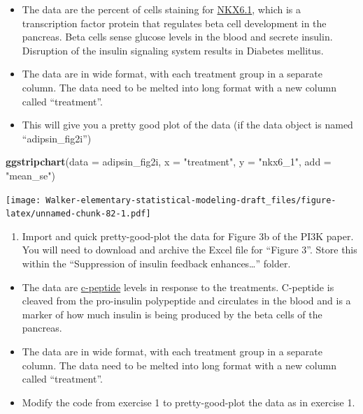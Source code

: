 \documentclass[]{book}
\newenvironment{Shaded}{\begin{snugshade}}{\end{snugshade}}
\newcommand{\DataTypeTok}[1]{\textcolor[rgb]{0.13,0.29,0.53}{#1}}
\newcommand{\KeywordTok}[1]{\textcolor[rgb]{0.13,0.29,0.53}{\textbf{#1}}}
\newcommand{\NormalTok}[1]{#1}
\newcommand{\StringTok}[1]{\textcolor[rgb]{0.31,0.60,0.02}{#1}}
\providecommand{\tightlist}{%
  \setlength{\itemsep}{0pt}\setlength{\parskip}{0pt}}
\begin{document}
\begin{itemize}
\tightlist
\item
  The data are the percent of cells staining for \href{https://en.wikipedia.org/wiki/NKX6-1}{NKX6.1}, which is a transcription factor protein that regulates beta cell development in the pancreas. Beta cells sense glucose levels in the blood and secrete insulin. Disruption of the insulin signaling system results in Diabetes mellitus.
\item
  The data are in wide format, with each treatment group in a separate column. The data need to be melted into long format with a new column called ``treatment''.
\item
  This will give you a pretty good plot of the data (if the data object is named ``adipsin\_fig2i'')
\end{itemize}

\begin{Shaded}
\begin{Highlighting}[]
\KeywordTok{ggstripchart}\NormalTok{(}\DataTypeTok{data =}\NormalTok{ adipsin_fig2i,}
             \DataTypeTok{x =} \StringTok{"treatment"}\NormalTok{,}
             \DataTypeTok{y =} \StringTok{"nkx6_1"}\NormalTok{,}
             \DataTypeTok{add =} \StringTok{"mean_se"}\NormalTok{)}
\end{Highlighting}
\end{Shaded}

\texttt{[image: Walker-elementary-statistical-modeling-draft\_files/figure-latex/unnamed-chunk-82-1.pdf]}

\begin{enumerate}
\def\labelenumi{\arabic{enumi}.}
\setcounter{enumi}{1}
\tightlist
\item
  Import and quick pretty-good-plot the data for Figure 3b of the PI3K paper. You will need to download and archive the Excel file for ``Figure 3''. Store this within the ``Suppression of insulin feedback enhances\ldots{}'' folder.
\end{enumerate}

\begin{itemize}
\tightlist
\item
  The data are \href{https://en.wikipedia.org/wiki/C-peptide}{c-peptide} levels in response to the treatments. C-peptide is cleaved from the pro-insulin polypeptide and circulates in the blood and is a marker of how much insulin is being produced by the beta cells of the pancreas.
\item
  The data are in wide format, with each treatment group in a separate column. The data need to be melted into long format with a new column called ``treatment''.
\item
  Modify the code from exercise 1 to pretty-good-plot the data as in exercise 1.
\end{itemize}
\end{document}
